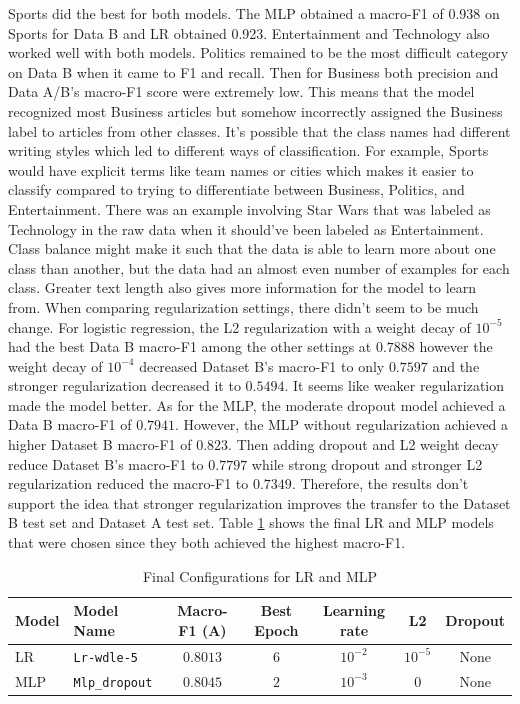 \documentclass[letterpaper,conference,compsoc,onecolumn]{IEEEtran}
\begin{document}
Sports did the best for both models. The MLP obtained a macro-F1 of 0.938 on Sports for Data B and LR obtained 0.923. Entertainment and Technology also worked well with both models. Politics remained to be the most difficult category on Data B when it came to F1 and recall.  Then for Business both precision and Data A/B's macro-F1 score were extremely low. This means that the model recognized most Business articles but somehow incorrectly assigned the Business label to articles from other classes.
It's possible that the class names had different writing styles which led to different ways of classification. For example, Sports would have explicit terms like team names or cities which makes it easier to classify compared to trying to differentiate between Business, Politics, and Entertainment. There was an example involving Star Wars that was labeled as Technology in the raw data when it should've been labeled as Entertainment. Class balance might make it such that the data is able to learn more about one class than another, but the data had an almost even number of examples for each class. Greater text length also gives more information for the model to learn from.
When comparing regularization settings, there didn't seem to be much change. For logistic regression, the L2 regularization with a weight decay of $10^{-5}$ had the best Data B macro-F1 among the other settings at $0.7888$ however the weight decay of $10^{-4}$ decreased Dataset B's macro-F1 to only $0.7597$ and the stronger regularization decreased it to $0.5494$. It seems like weaker regularization made the model better.
As for the MLP, the moderate dropout model achieved a Data B macro-F1 of $0.7941$. However, the MLP without regularization achieved a higher Dataset B macro-F1 of $0.823$. Then adding dropout and L2 weight decay reduce Dataset B's macro-F1 to $0.7797$ while strong dropout and stronger L2 regularization reduced the macro-F1 to $0.7349$. Therefore, the results don't support the idea that stronger regularization improves the transfer to the Dataset B test set and Dataset A test set. 
Table \ref{table:final_config_for_lr_mlp} shows the final LR and MLP models that were chosen since they both achieved the highest macro-F1.

\begin{table}[h]
  \centering
  \caption{Final Configurations for LR and MLP}
  \label{table:final_config_for_lr_mlp}
  \begin{tabular}{llccccc}
    \hline
    \textbf{Model} & \textbf{Model Name} & \textbf{Macro-F1 (A)} & \textbf{Best Epoch} & \textbf{Learning rate} & \textbf{L2} & \textbf{Dropout}\\
    \hline
    LR & \texttt{Lr-wdle-5} & $0.8013$ & $6$ & $10^{-2}$ & $10^{-5}$ & None\\
    MLP & \texttt{Mlp\_dropout} & $0.8045$ & $2$ & $10^{-3}$ & $0$ & None\\
    \hline  
  \end{tabular}
\end{table}
\end{document}
